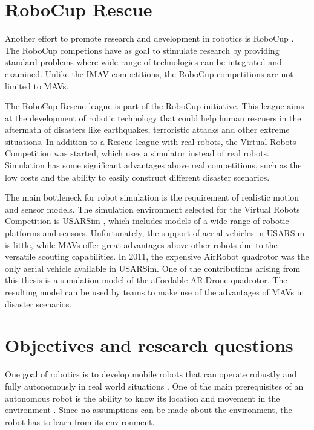 	\section{RoboCup Rescue}
Another effort to promote research and development in robotics is RoboCup \cite{kitano1997robocup}.
The RoboCup competions have as goal to stimulate research by providing standard problems where wide range of technologies can be integrated and examined.
Unlike the IMAV competitions, the RoboCup competitions are not limited to MAVs.

The RoboCup Rescue league \cite{kitano1999robocup} is part of the RoboCup initiative.
This league aims at the development of robotic technology that could 
help human rescuers in the aftermath of disasters like earthquakes, terroristic attacks and other extreme situations.
In addition to a Rescue league with real robots, the Virtual Robots Competition was started, which uses a simulator instead of real robots.
Simulation has some \mbox{significant} advantages above real competitions, such as the low costs and the ability to easily construct different disaster scenarios.

The main bottleneck for robot simulation is the requirement of realistic motion and sensor models.
The simulation environment selected for the Virtual Robots Competition is USARSim \cite{Balakirsky2009iros,carpin2007usarsim}, which includes models of a wide range of robotic platforms and sensors.
Unfortunately, the support of aerial vehicles in USARSim is little, while MAVs offer great advantages above other robots due to the versatile scouting capabilities.
In 2011, the expensive AirRobot quadrotor was the only aerial vehicle available in USARSim.
One of the contributions arising from this thesis is a simulation model of the affordable AR.Drone quadrotor.
The resulting model can be used by teams to make use of the advantages of MAVs in disaster scenarios.


	\section{Objectives and research questions}
One goal of robotics is to develop mobile robots that can operate robustly and fully autonomously in real world situations \cite{murphy2000introduction}.
One of the main prerequisites of an autonomous robot is the ability to know its location and movement in the environment \cite{talluri1992position}.
Since no assumptions can be made about the environment, the robot has to learn from its environment.

